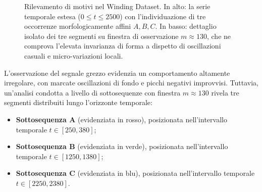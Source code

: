 \begin{figure}[H]
\caption{Rilevamento di motivi nel Winding Dataset. In alto: la serie temporale estesa ($0 \le t \le 2500$) con l'individuazione di tre occorrenze morfologicamente affini $A, B, C$. In basso: dettaglio isolato dei tre segmenti su finestra di osservazione $m \approx 130$, che ne comprova l'elevata invarianza di forma a dispetto di oscillazioni casuali e micro-variazioni locali.}
\label{fig:ts-winding-motif}
\end{figure}

L'osservazione del segnale grezzo evidenzia un comportamento altamente irregolare, con marcate oscillazioni di fondo e picchi negativi improvvisi. Tuttavia, un'analisi condotta a livello di sottosequenze con finestra $m \approx 130$ rivela tre segmenti distribuiti lungo l'orizzonte temporale:
\begin{itemize}
    \item \textbf{Sottosequenza A} (evidenziata in rosso), posizionata nell'intervallo temporale $t \in [250, 380]$;
    \item \textbf{Sottosequenza B} (evidenziata in verde), posizionata nell'intervallo temporale $t \in [1250, 1380]$;
    \item \textbf{Sottosequenza C} (evidenziata in blu), posizionata nell'intervallo temporale $t \in [2250, 2380]$.
\end{itemize}

